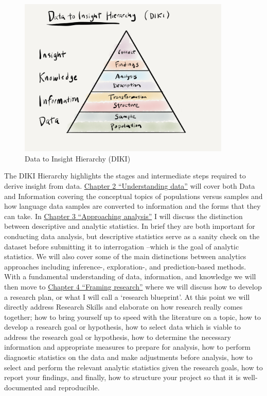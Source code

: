 \documentclass[
  letterpaper,
]{latex/krantz}
\begin{document}
\begin{figure}

{\centering \includegraphics[width=0.9\textwidth,height=\textheight]{./figures/text-analysis/diki-hierarchy-paper.png}

}

\caption{\label{fig-diki-hierarchy}Data to Insight Hierarchy (DIKI)}

\end{figure}

The DIKI Hierarchy highlights the stages and intermediate steps required
to derive insight from data.
\protect\hyperlink{sec-understanding-data}{Chapter 2 ``Understanding
data''} will cover both Data and Information covering the conceptual
topics of populations versus samples and how language data samples are
converted to information and the forms that they can take. In
\protect\hyperlink{sec-approaching-analysis}{Chapter 3 ``Approaching
analysis''} I will discuss the distinction between descriptive and
analytic statistics. In brief they are both important for conducting
data analysis, but descriptive statistics serve as a sanity check on the
dataset before submitting it to interrogation --which is the goal of
analytic statistics. We will also cover some of the main distinctions
between analytics approaches including inference-, exploration-, and
prediction-based methods. With a fundamental understanding of data,
information, and knowledge we will then move to
\protect\hyperlink{framing-research-chapter}{Chapter 4 ``Framing
research''} where we will discuss how to develop a research plan, or
what I will call a `research blueprint'. At this point we will directly
address Research Skills and elaborate on how research really comes
together; how to bring yourself up to speed with the literature on a
topic, how to develop a research goal or hypothesis, how to select data
which is viable to address the research goal or hypothesis, how to
determine the necessary information and appropriate measures to prepare
for analysis, how to perform diagnostic statistics on the data and make
adjustments before analysis, how to select and perform the relevant
analytic statistics given the research goals, how to report your
findings, and finally, how to structure your project so that it is
well-documented and reproducible.
\end{document}
